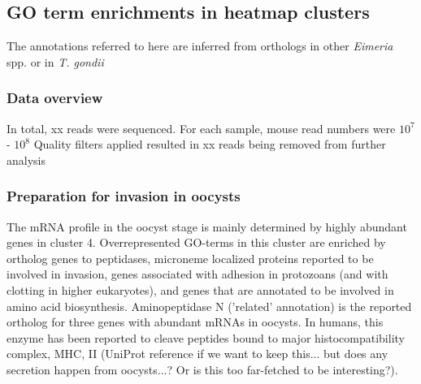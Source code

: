 \documentclass{bmcart}
\begin{document}

\subsection*{GO term enrichments in heatmap clusters}
The annotations referred to here are inferred from orthologs in other \textit{Eimeria} spp. or
in \textit{T. gondii}

\subsubsection*{Data overview}
In total, xx reads were sequenced. For each sample, mouse read numbers were $10^7$ - $10^8$
Quality filters applied resulted in xx reads being removed from further analysis

\subsubsection*{Preparation for invasion in oocysts}
The mRNA profile in the oocyst stage is mainly determined by highly
abundant genes in cluster 4.  Overrepresented GO-terms in this cluster
are enriched by ortholog genes to peptidases, microneme localized
proteins reported to be involved in invasion, genes associated with
adhesion in protozoans (and with clotting in higher eukaryotes), and
genes that are annotated to be involved in amino acid biosynthesis.
Aminopeptidase N ('related' annotation) is the reported ortholog for
three genes with abundant mRNAs in oocysts. In humans, this enzyme has
been reported to cleave peptides bound to major histocompatibility
complex, MHC, II (UniProt reference if we want to keep this... but
does any secretion happen from oocysts...? Or is this too far-fetched
to be interesting?).
\end{document}
